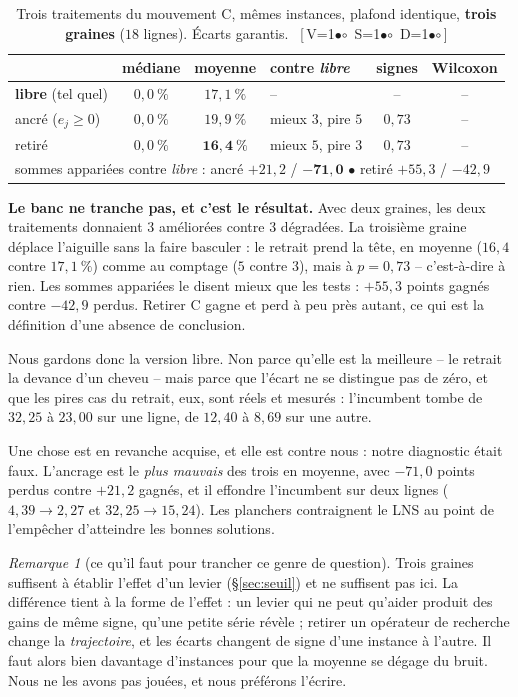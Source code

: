 \documentclass[11pt,a4paper]{article}
\theoremstyle{plain}
\theoremstyle{remark}
\newtheorem{remark}{Remarque}
\newcommand{\cfgm}[1]{\ifnum#1=1$\bullet$\else$\circ$\fi}
\newcommand{\conf}[3]{%
  \textsf{\footnotesize[\,V\cfgm{#1}\ S\cfgm{#2}\ D\cfgm{#3}\,]}}
\begin{document}
\begin{table}[H]
\centering
\caption{Trois traitements du mouvement C, mêmes instances, plafond
identique, \textbf{trois graines} ($18$ lignes). Écarts garantis.\
\conf{1}{1}{1}}
\label{tab:mouvementc}
\begin{tabular}{lcclcc}
\toprule
& médiane & moyenne & contre \emph{libre} & signes & Wilcoxon\\
\midrule
\textbf{libre} (tel quel) & $0{,}0\ \%$ & $17{,}1\ \%$ & -- & -- & --\\
ancré ($e_j\ge0$) & $0{,}0\ \%$ & $19{,}9\ \%$
 & mieux $3$, pire $5$ & $0{,}73$ & --\\
retiré & $0{,}0\ \%$ & $\mathbf{16{,}4\ \%}$
 & mieux $5$, pire $3$ & $0{,}73$ & --\\
\midrule
\multicolumn{6}{l}{sommes appariées contre \emph{libre} :
 ancré $+21{,}2$ / $\mathbf{-71{,}0}$ \quad$\bullet$\quad
 retiré $+55{,}3$ / $-42{,}9$}\\
\bottomrule
\end{tabular}
\end{table}

\noindent
\textbf{Le banc ne tranche pas, et c'est le résultat.} Avec deux graines,
les deux traitements donnaient $3$ améliorées contre $3$ dégradées. La
troisième graine déplace l'aiguille sans la faire basculer : le retrait
prend la tête, en moyenne ($16{,}4$ contre $17{,}1\ \%$) comme au comptage
($5$ contre $3$), mais à $p=0{,}73$ -- c'est-à-dire à rien. Les sommes
appariées le disent mieux que les tests : $+55{,}3$ points gagnés contre
$-42{,}9$ perdus. Retirer C gagne et perd à peu près autant, ce qui est la
définition d'une absence de conclusion.

Nous gardons donc la version libre. Non parce qu'elle est la meilleure --
le retrait la devance d'un cheveu -- mais parce que l'écart ne se distingue
pas de zéro, et que les pires cas du retrait, eux, sont réels et mesurés :
l'incumbent tombe de $32{,}25$ à $23{,}00$ sur une ligne, de $12{,}40$ à
$8{,}69$ sur une autre.

Une chose est en revanche acquise, et elle est contre nous : notre
diagnostic était faux. L'ancrage est le \emph{plus mauvais} des trois en
moyenne, avec $-71{,}0$ points perdus contre $+21{,}2$ gagnés, et il
effondre l'incumbent sur deux lignes ($4{,}39\to 2{,}27$ et
$32{,}25\to 15{,}24$). Les planchers contraignent le LNS au point de
l'empêcher d'atteindre les bonnes solutions.

\begin{remark}[ce qu'il faut pour trancher ce genre de question]
Trois graines suffisent à établir l'effet d'un levier
(§\ref{sec:seuil}) et ne suffisent pas ici. La différence tient à la forme
de l'effet : un levier qui ne peut qu'aider produit des gains de même
signe, qu'une petite série révèle ; retirer un opérateur de recherche
change la \emph{trajectoire}, et les écarts changent de signe d'une
instance à l'autre. Il faut alors bien davantage d'instances pour que la
moyenne se dégage du bruit. Nous ne les avons pas jouées, et nous
préférons l'écrire.
\end{remark}
\end{document}
